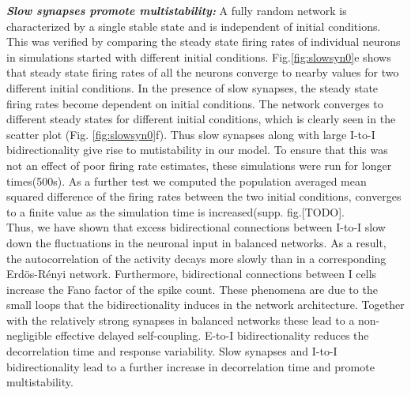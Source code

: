 \emph{\textbf{Slow synapses promote multistability:}} A fully random network is characterized by a single stable state and is independent of initial conditions. This was verified by comparing the steady state firing rates of individual neurons in simulations started with different initial conditions.  Fig.\ref{fig:slowsyn0}e shows that steady state firing rates of all the neurons converge to nearby values for two different initial conditions. In the presence of slow synapses, the steady state firing rates become dependent on initial conditions.
The network converges to different steady states for different initial conditions, which is clearly seen in the scatter plot (Fig. \ref{fig:slowsyn0}f). Thus slow synapses along with large I-to-I bidirectionality give rise to mutistability in our model. To ensure that this was not an effect of poor firing rate estimates, these simulations were run for longer times(500s). As a further test we computed the population averaged mean squared difference of the firing rates between the two initial conditions, converges to a finite value as the simulation time is increased(supp. fig.[TODO]. \\

Thus, we have shown that excess bidirectional connections between I-to-I slow down the fluctuations in the neuronal input in balanced networks. As a result, the autocorrelation of the activity decays more slowly than in a corresponding Erdös-Rényi network. Furthermore, bidirectional connections between I cells increase the Fano factor of the spike count. These phenomena are due to the small loops that the bidirectionality induces in the network architecture. Together with the relatively strong synapses in balanced networks these lead to a non-negligible effective delayed self-coupling. E-to-I bidirectionality reduces the decorrelation time and response variability. Slow synapses and I-to-I bidirectionality lead to a further increase in decorrelation time and promote multistability.


